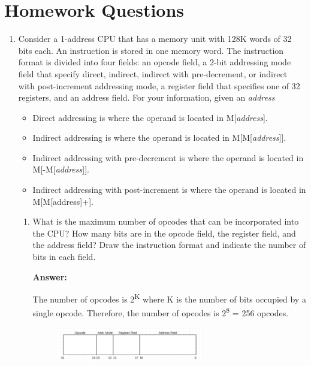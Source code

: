 \documentclass[12pt,letterpaper]{article}
\begin{document}
\section{Homework Questions}
\begin{enumerate}
    \item
    Consider a 1-address CPU that has a memory unit with 128K words of 32 bits each. 
    An instruction is stored in one memory word. 
    The instruction format is divided into four fields: an opcode field, a 2-bit addressing mode
    field that specify direct, indirect, indirect with pre-decrement, or indirect with post-increment addressing mode, a register field that specifies one of 32 registers, and an address field. 
    For your information, given an \textit{address}
    \begin{itemize}
        \item{Direct addressing is where the operand is located in M[\textit{address}].}
        \item{Indirect addressing is where the operand is located in M[M[\textit{address}]].}
        \item{Indirect addressing with pre-decrement is where the operand is located in M[-M[\textit{address}]].}
        \item{Indirect addressing with post-increment is where the operand is located in M[M[address]+].}
    \end{itemize}
	 \begin{enumerate}
        \item{What is the maximum number of opcodes that can be incorporated into the CPU? 
        	How many bits are in the opcode field, the register field, and the address field? 
        	Draw the instruction format and indicate the number of bits in each field.}
        
        \textbf{Answer:}
        
        The number of opcodes is 2\textsuperscript{K} where K is the number of bits occupied by a single opcode. Therefore, the number of opcodes is 2\textsuperscript{8} = 256 opcodes.
        
        \begin{figure}[h]
        	\centering
        	\includegraphics[width=0.65\textwidth]{Q1.png}
        \end{figure}
        

\end{enumerate}
\end{enumerate}
\end{document}
